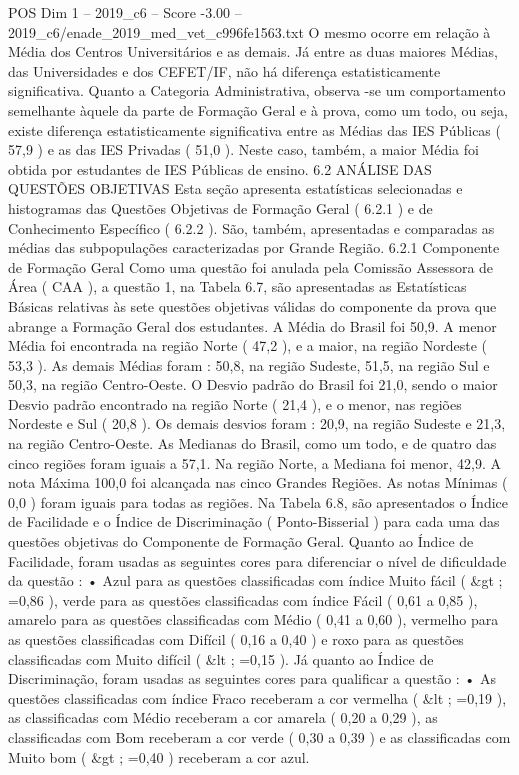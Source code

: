 \begin{textsample}{POS Dim 1 – 2019\_c6 – Score -3.00 – 2019\_c6/enade\_2019\_med\_vet\_c996fe1563.txt}
O mesmo ocorre em relação à Média dos Centros Universitários e as demais.
Já entre as duas maiores Médias, das Universidades e dos CEFET/IF, não há diferença estatisticamente significativa.
Quanto a Categoria Administrativa, observa -se um comportamento semelhante àquele da parte de Formação Geral e à prova, como um todo, ou seja, existe diferença estatisticamente significativa entre as Médias das IES Públicas ( 57,9 ) e as das IES Privadas ( 51,0 ).
Neste caso, também, a maior Média foi obtida por estudantes de IES Públicas de ensino. 6.2 ANÁLISE DAS QUESTÕES OBJETIVAS Esta seção apresenta estatísticas selecionadas e histogramas das Questões Objetivas de Formação Geral ( 6.2.1 ) e de Conhecimento Específico ( 6.2.2 ).
São, também, apresentadas e comparadas as médias das subpopulações caracterizadas por Grande Região. 6.2.1 Componente de Formação Geral Como uma questão foi anulada pela Comissão Assessora de Área ( CAA ), a questão 1, na Tabela 6.7, são apresentadas as Estatísticas Básicas relativas às sete questões objetivas válidas do componente da prova que abrange a Formação Geral dos estudantes.
A Média do Brasil foi 50,9.
A menor Média foi encontrada na região Norte ( 47,2 ), e a maior, na região Nordeste ( 53,3 ).
As demais Médias foram : 50,8, na região Sudeste, 51,5, na região Sul e 50,3, na região Centro-Oeste.
O Desvio padrão do Brasil foi 21,0, sendo o maior Desvio padrão encontrado na região Norte ( 21,4 ), e o menor, nas regiões Nordeste e Sul ( 20,8 ).
Os demais desvios foram : 20,9, na região Sudeste e 21,3, na região Centro-Oeste.
As Medianas do Brasil, como um todo, e de quatro das cinco regiões foram iguais a 57,1.
Na região Norte, a Mediana foi menor, 42,9.
A nota Máxima 100,0 foi alcançada nas cinco Grandes Regiões.
As notas Mínimas ( 0,0 ) foram iguais para todas as regiões.
Na Tabela 6.8, são apresentados o Índice de Facilidade e o Índice de Discriminação ( Ponto-Bisserial ) para cada uma das questões objetivas do Componente de Formação Geral.
Quanto ao Índice de Facilidade, foram usadas as seguintes cores para diferenciar o nível de dificuldade da questão : • Azul para as questões classificadas com índice Muito fácil ( \&gt ; =0,86 ), verde para as questões classificadas com índice Fácil ( 0,61 a 0,85 ), amarelo para as questões classificadas com Médio ( 0,41 a 0,60 ), vermelho para as questões classificadas com Difícil ( 0,16 a 0,40 ) e roxo para as questões classificadas com Muito difícil ( \&lt ; =0,15 ).
Já quanto ao Índice de Discriminação, foram usadas as seguintes cores para qualificar a questão : • As questões classificadas com índice Fraco receberam a cor vermelha ( \&lt ; =0,19 ), as classificadas com Médio receberam a cor amarela ( 0,20 a 0,29 ), as classificadas com Bom receberam a cor verde ( 0,30 a 0,39 ) e as classificadas com Muito bom ( \&gt ; =0,40 ) receberam a cor azul.

\end{textsample}
